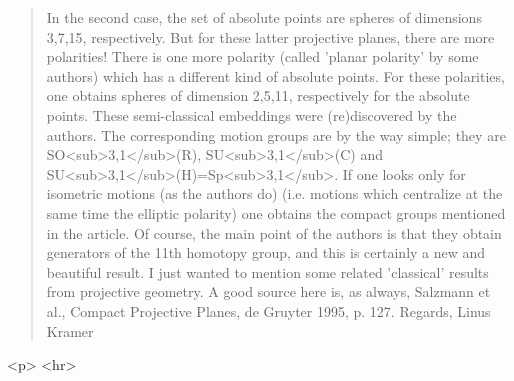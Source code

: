 \begin{quote}
In the second case, the set of absolute points are spheres of
dimensions 3,7,15, respectively.
But for these latter projective planes, there are more polarities!
There is one more polarity (called 'planar polarity' by some authors)
which has a different kind of absolute points. For these polarities,
one obtains spheres of dimension 2,5,11, respectively for the
absolute points. 
These semi-classical embeddings were (re)discovered by the authors.
The corresponding motion groups are by the way simple; they are
SO<sub>3,1</sub>(R), SU<sub>3,1</sub>(C) and SU<sub>3,1</sub>(H)=Sp<sub>3,1</sub>.
If one looks only for isometric motions (as the authors do) (i.e.
motions which centralize at the same time the elliptic polarity)
one obtains the compact groups mentioned in the article.
Of course, the main point of the authors is that they obtain
generators of the 11th homotopy group, and this is certainly
a new and beautiful result. I just wanted to mention some related
'classical' results from projective geometry.
A good source here is, as always, Salzmann et al., Compact
Projective Planes, de Gruyter 1995, p. 127.
Regards, Linus Kramer
\end{quote}
    

<p> <hr>



